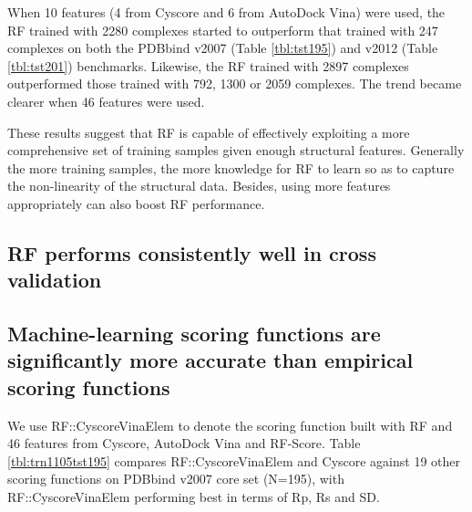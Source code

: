 \documentclass[journal=jacsat,manuscript=article]{achemso}
\begin{document}
When 10 features (4 from Cyscore and 6 from AutoDock Vina) were used, the RF trained with 2280 complexes started to outperform that trained with 247 complexes on both the PDBbind v2007 (Table \ref{tbl:tst195}) and v2012 (Table \ref{tbl:tst201}) benchmarks. Likewise, the RF trained with 2897 complexes outperformed those trained with 792, 1300 or 2059 complexes. The trend became clearer when 46 features were used.

These results suggest that RF is capable of effectively exploiting a more comprehensive set of training samples given enough structural features. Generally the more training samples, the more knowledge for RF to learn so as to capture the non-linearity of the structural data. Besides, using more features appropriately can also boost RF performance.

\subsection{RF performs consistently well in cross validation}



\subsection{Machine-learning scoring functions are significantly more accurate than empirical scoring functions}

We use RF::CyscoreVinaElem to denote the scoring function built with RF and 46 features from Cyscore, AutoDock Vina and RF-Score. Table \ref{tbl:trn1105tst195} compares RF::CyscoreVinaElem and Cyscore against 19 other scoring functions on PDBbind v2007 core set (N=195), with RF::CyscoreVinaElem performing best in terms of Rp, Rs and SD.
\end{document}
